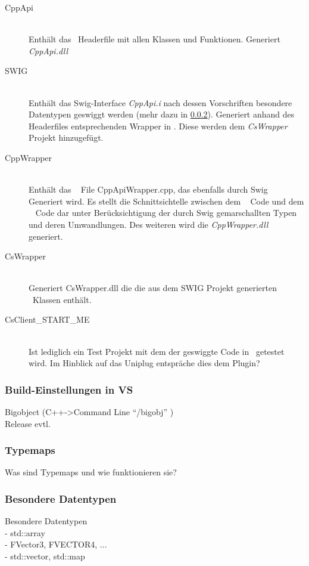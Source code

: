 \begin{description}
\item[CppApi]\hfill \\
Enthält das \CC~Headerfile mit allen Klassen und Funktionen. Generiert \emph{CppApi.dll}
\item[SWIG]\hfill \\
Enthält das Swig-Interface \emph{CppApi.i} nach dessen Vorschriften besondere Datentypen geswiggt werden (mehr dazu in \ref{subsubsec:Typemaps}). Generiert anhand des Headerfiles entsprechenden Wrapper in \CS. Diese werden dem \emph{CsWrapper} Projekt hinzugefügt.
\item[CppWrapper]\hfill \\
Enthält das \CC~ File CppApiWrapper.cpp, das ebenfalls durch Swig Generiert wird. Es stellt die Schnittsichtelle zwischen dem \CC~ Code und dem \CS~ Code dar unter Berücksichtigung der durch Swig gemarschallten Typen und deren Umwandlungen. Des weiteren wird die \emph{CppWrapper.dll} generiert. 
\item[CsWrapper]\hfill \\
Generiert CsWrapper.dll die die aus dem SWIG Projekt generierten \CS~Klassen enthält. 
\item[CsClient\_START\_ME]\hfill \\
Ist lediglich ein Test Projekt mit dem der geswiggte Code in \CS~getestet wird. Im Hinblick auf das Uniplug entspräche dies dem Plugin?
\end{description}

  

\subsubsection{Build-Einstellungen in VS}\label{subsubsec:Build}
	Bigobject (C++->Command Line "`/bigobj"' )\\
	Release evtl.


\subsubsection{Typemaps}\label{subsubsec:Typemaps}

Was sind Typemaps und wie funktionieren sie?\\

\subsubsection{Besondere Datentypen}\label{subsubsec:Datentypen}
Besondere Datentypen\\
		- std::array\\
		- FVector3, FVECTOR4, ...\\
		- std::vector, std::map\\
	

